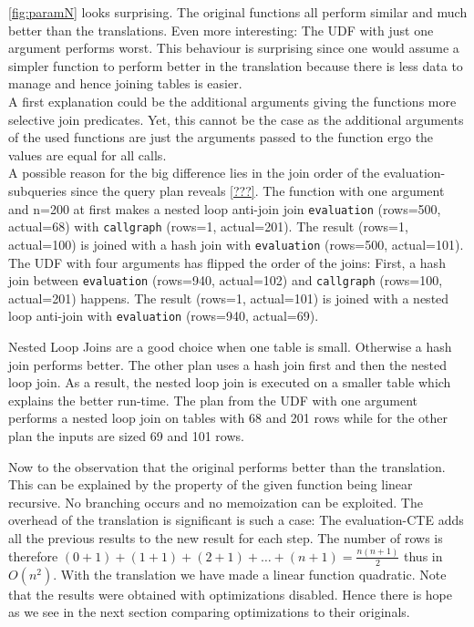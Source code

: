 \autoref{fig:paramN} looks surprising. The original functions all perform similar and much better than the translations. Even more interesting: The UDF with just one argument performs worst. This behaviour is surprising since one would assume a simpler function to perform better in the translation because there is less data to manage and hence joining tables is easier.\\
A first explanation could be the additional arguments giving the functions more selective join predicates. Yet, this cannot be the case as the additional arguments of the used functions are just the arguments passed to the function ergo the values are equal for all calls.\\
A possible reason for the big difference lies in the join order of the evaluation-subqueries since the query plan reveals \autoref{???}. The function with one argument and n=200 at first makes a nested loop anti-join join \texttt{evaluation} (rows=500, actual=68) with \texttt{callgraph} (rows=1, actual=201). The result (rows=1, actual=100) is joined with a hash join with \texttt{evaluation} (rows=500, actual=101).\\
The UDF with four arguments has flipped the order of the joins: First, a hash join between \texttt{evaluation} (rows=940, actual=102) and \texttt{callgraph} (rows=100, actual=201) happens. The result (rows=1, actual=101) is joined with a nested loop anti-join with \texttt{evaluation} (rows=940, actual=69).

Nested Loop Joins are a good choice when one table is small. Otherwise a hash join performs better. The other plan uses a hash join first and then the nested loop join. As a result, the nested loop join is executed on a smaller table which explains the better run-time. The plan from the UDF with one argument performs a nested loop join on tables with 68 and 201 rows while for the other plan the inputs are sized 69 and 101 rows.

Now to the observation that the original performs better than the translation. This can be explained by the property of the given function being linear recursive. No branching occurs and no memoization can be exploited. The overhead of the translation is significant is such a case: The evaluation-CTE adds all the previous results to the new result for each step. The number of rows is therefore $(0 + 1) + (1 + 1) + (2 + 1) + \dots + (n + 1) = \frac{n(n+1)}{2}$ thus in $O(n^2)$. With the translation we have made a linear function quadratic. Note that the results were obtained with optimizations disabled. Hence there is hope as we see in the next section comparing optimizations to their originals.


